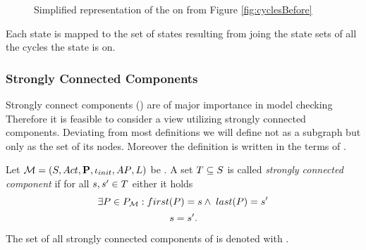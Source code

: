 \documentclass[preview]{standalone}
\begin{document}
\begin{figure}[h]
	\centering
	
	\caption{Simplified representation of the \viewN \viewcycleset on \mdp from Figure \ref{fig:cyclesBefore}} 
	\label{fig:cycleAfterSet0}  
\end{figure}


Each state is mapped to the set of states resulting from joing the state sets of all the cycles the state is on. 

\subsubsection{Strongly Connected Components}
Strongly connect components (\sccN) are of major importance in model checking 
Therefore it is feasible to consider a view utilizing strongly connected components. Deviating from most definitions we will define \sccN not as a subgraph but only as the set of its nodes. Moreover the definition is written in the terms of \achgphN.

\begin{definition}
	Let ${{{\mathcal{M}}}} = {{({S}, {Act}, {\textbf{P}}, {\iota_{init}}, {AP}, {L})}}$ be \achgphN. A set ${T} \subseteq {S}$ is called \emph{strongly connected component} if for all ${s}, {s}' \in {T}$ either it holds
	\[
		\exists \path \in \pathset : \pfirst(\path) = \state \land \; \plast(\path) = \state'
	\]
	{}
	\[
	 {s} = {s}'\text{.}
	\]
	
	\noindent
	The set of all strongly connected components of \chgph is denoted with \setscc.
\end{definition}
\end{document}
